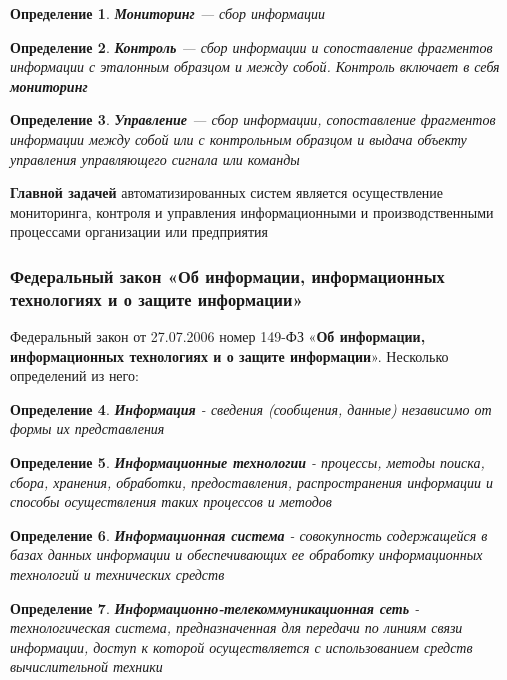 \documentclass{article}
\newtheorem{definition}{Определение}
\begin{document}
\begin{definition}
    \textbf{Мониторинг} — сбор информации
\end{definition}

\begin{definition}
    \textbf{Контроль} — сбор информации и сопоставление фрагментов информации с эталонным образцом и между собой. Контроль включает в себя \textbf{мониторинг}
\end{definition}

\begin{definition}
    \textbf{Управление} — сбор информации, сопоставление фрагментов информации между собой или с контрольным образцом и выдача объекту управления управляющего сигнала или команды
\end{definition}

\textbf{Главной задачей} автоматизированных систем является осуществление мониторинга, контроля и управления информационными и производственными процессами организации или предприятия

\subsubsection{Федеральный закон «Об информации, информационных технологиях и о защите информации»}

Федеральный закон от 27.07.2006 номер 149-ФЗ «\textbf{Об информации, информационных технологиях и о защите информации}». Несколько определений из него:

\begin{definition}
    \textbf{Информация} - сведения (сообщения, данные) независимо от формы их представления
\end{definition}

\begin{definition}
    \textbf{Информационные технологии} - процессы, методы поиска, сбора, хранения, обработки, предоставления, распространения информации и способы осуществления таких процессов и методов
\end{definition}

\begin{definition}
    \textbf{Информационная система} - совокупность содержащейся в базах данных информации и обеспечивающих ее обработку информационных технологий и технических средств
\end{definition}

\begin{definition}
    \textbf{Информационно-телекоммуникационная сеть} - технологическая система, предназначенная для передачи по линиям связи информации, доступ к которой осуществляется с использованием средств вычислительной техники
\end{definition}
\end{document}
